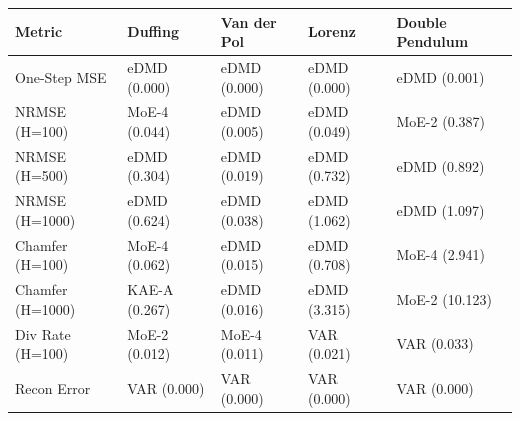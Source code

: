 \begin{tabular}{lllll}
\toprule
Metric & Duffing & Van der Pol & Lorenz & Double Pendulum \\
\midrule
One-Step MSE & eDMD (0.000) & eDMD (0.000) & eDMD (0.000) & eDMD (0.001) \\
NRMSE (H=100) & MoE-4 (0.044) & eDMD (0.005) & eDMD (0.049) & MoE-2 (0.387) \\
NRMSE (H=500) & eDMD (0.304) & eDMD (0.019) & eDMD (0.732) & eDMD (0.892) \\
NRMSE (H=1000) & eDMD (0.624) & eDMD (0.038) & eDMD (1.062) & eDMD (1.097) \\
Chamfer (H=100) & MoE-4 (0.062) & eDMD (0.015) & eDMD (0.708) & MoE-4 (2.941) \\
Chamfer (H=1000) & KAE-A (0.267) & eDMD (0.016) & eDMD (3.315) & MoE-2 (10.123) \\
Div Rate (H=100) & MoE-2 (0.012) & MoE-4 (0.011) & VAR (0.021) & VAR (0.033) \\
Recon Error & VAR (0.000) & VAR (0.000) & VAR (0.000) & VAR (0.000) \\
\bottomrule
\end{tabular}

